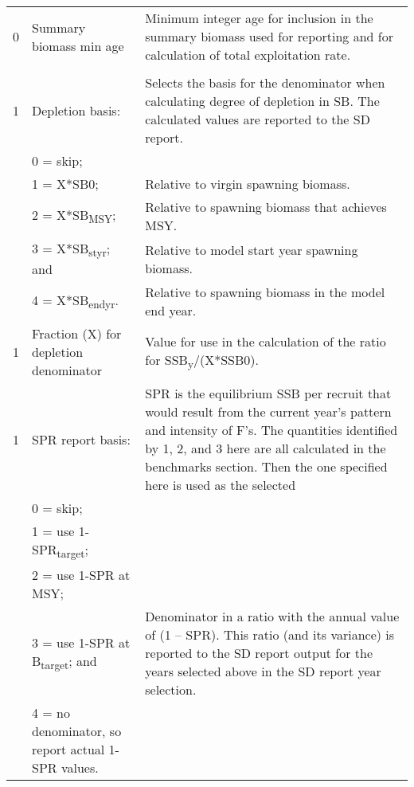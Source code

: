 {\begin{landscape}
\begin{longtable}{p{1.5cm} p{7.2cm} p{12.3cm}}
 \hline
 0 & Summary biomass min age & \multirow{1}{1cm}[-0.25cm]{\parbox{12.5cm}{Minimum integer age for inclusion in the summary biomass used for reporting and for calculation of total exploitation rate.}}\Tstrut\\
   & & \\ 

 \hline
 1 & Depletion basis: & \multirow{1}{1cm}[-0.25cm]{\parbox{12.5cm}{Selects the basis for the denominator when calculating degree of depletion in SB.  The calculated values are reported to the SD report.}}\Tstrut\\
   & 0 = skip; & \\
   & 1 = X*SB0; & Relative to virgin spawning biomass.\\
   & 2 = X*SB\textsubscript{MSY}; & Relative to spawning biomass that achieves MSY.\\
   & 3 = X*SB\textsubscript{styr}; and & Relative to model start year spawning biomass.\\
   & 4 = X*SB\textsubscript{endyr}. & Relative to spawning biomass in the model end year.\\
  
 \hline
 1 & Fraction (X) for depletion denominator & Value for use in the calculation of the ratio for SSB\textsubscript{y}/(X*SSB0).\Tstrut\\

 \hline
 1 & SPR report basis: & \multirow{1}{1cm}[-0.25cm]{\parbox{12.5cm}{SPR is the equilibrium SSB per recruit that would result from the current year’s pattern and intensity of F’s.  The quantities identified by 1, 2, and 3 here are all calculated in the benchmarks section.  Then the one specified here is used as the selected }}\Tstrut\\
   & 0 = skip; & \\
   & 1 = use 1-SPR\textsubscript{target}; & \\
   & 2 = use 1-SPR at MSY; & \Tstrut\\
 
 \pagebreak
   & 3 = use 1-SPR at B\textsubscript{target}; and & \multirow{1}{1cm}[-0.25cm]{\parbox{12.5cm}{Denominator in a ratio with the annual value of (1 – SPR). This ratio (and its variance) is reported to the SD report output for the years selected above in the SD report year selection.}}\Tstrut\\
   & 4 = no denominator, so report actual 1-SPR values. & \\
  

\end{longtable}
\end{landscape}}
